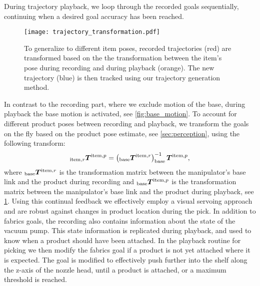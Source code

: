 During trajectory playback, we loop through the recorded goals sequentially, continuing when a desired goal accuracy has been reached. 
\begin{figure}[ht]
  \centering
  \texttt{[image: trajectory\_transformation.pdf]}
  \caption{To generalize to different item poses, recorded
  trajectories (red) are transformed based on the the
  transformation between the item's pose during recording
  and during playback (orange). The new trajectory (blue) is then
  tracked using our trajectory generation method.
  }
  \label{fig:transformation_trajectory}
\end{figure}
%
In contrast to the recording part, where we exclude motion
of the base, during playback the base motion is activated,
see \cref{fig:base_motion}. To account for different product
poses between recording and playback, we transform the goals
on the fly based on the product pose estimate, see
\cref{sec:perception}, using the following transform:
\[
  _{\textrm{item},r}\bm{T}^{\textrm{item},p} =
  \left(_{\textrm{base}}\bm{T}^{\textrm{item},r}\right)^{-1}_{\textrm{base}}\bm{T}^{\textrm{item},p},
\]
where $_{\textrm{base}}\bm{T}^{\textrm{item},r}$ is the transformation matrix
between the manipulator's base link and the product during
recording and $_{\textrm{base}}\bm{T}^{\textrm{item},p}$ is the
transformation matrix between the manipulator's base link and
the product during playback, see
\cref{fig:transformation_trajectory}.
Using this continual feedback we effectively employ a visual servoing \cite{kmich2022image} approach and are robust against changes in product location during the pick.
In addition to \ac{fabrics} goals, the recording also contains information about the state of the vacuum pump. This state information is replicated during playback, and used to know when a product should have been attached.
In the playback routine for picking we then modify the fabrics goal if a product is not yet attached where it is expected. The goal is modified to effectively push further into the shelf along the z-axis of the nozzle head, until a product is attached, or a maximum threshold is reached.
